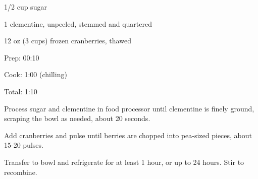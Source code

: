 \documentclass[oneside]{book}  %
\def\thisrecipe{}  %
\newcommand{\recipe}[1]{\section{#1}\def\thisrecipe{: #1}} %
\begin{document}
\begin{IT}[0.770]
  \begin{ingredients}
    \item[1/2 cup] sugar
    \item[1] clementine, unpeeled, stemmed and quartered
    \item[12 oz (3 cups)] frozen cranberries, thawed
  \end{ingredients}

  \switchcolumn

  \begin{timeline}
    \item[Prep:]  00:10
    \item[Cook:]  1:00 (chilling)
    \item[Total:] 1:10
  \end{timeline}
\end{IT}

\begin{directions}
  \item Process sugar and clementine in food processor until clementine is finely
    ground, scraping the bowl as needed, about 20 seconds.

  \item Add cranberries and pulse until berries are chopped into pea-sized
    pieces, about 15-20 pulses.

  \columnbreak

  \item Transfer to bowl and refrigerate for at least 1 hour, or up to 24 hours.
    Stir to recombine.
\end{directions}

\end{document}
